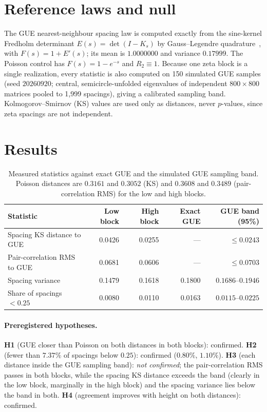 \documentclass[11pt]{article}
\begin{document}
\section{Reference laws and null}
The GUE nearest-neighbour spacing law is computed exactly from the sine-kernel Fredholm determinant
$E(s)=\det(I-K_s)$ by Gauss--Legendre quadrature~\cite{bornemann2010}, with $F(s)=1+E'(s)$; its mean is $1.0000000$
and variance $0.17999$. The Poisson control has $F(s)=1-e^{-s}$ and $R_2\equiv1$. Because one zeta block is a single
realization, every statistic is also computed on 150 simulated GUE samples (seed $20260920$; central,
semicircle-unfolded eigenvalues of independent $800\times800$ matrices pooled to 1{,}999 spacings), giving a calibrated
sampling band. Kolmogorov--Smirnov (KS) values are used only as distances, never $p$-values, since zeta spacings are
not independent.

\section{Results}
\begin{table}[h]
\centering
\begin{tabular}{lrrrr}
\toprule
Statistic & Low block & High block & Exact GUE & GUE band (95\%)\\
\midrule
Spacing KS distance to GUE & 0.0426 & 0.0255 & --- & $\le 0.0243$\\
Pair-correlation RMS to GUE & 0.0681 & 0.0606 & --- & $\le 0.0703$\\
Spacing variance & 0.1479 & 0.1618 & 0.1800 & $0.1686$--$0.1946$\\
Share of spacings $<0.25$ & 0.0080 & 0.0110 & 0.0163 & $0.0115$--$0.0225$\\
\bottomrule
\end{tabular}
\caption{Measured statistics against exact GUE and the simulated GUE sampling band. Poisson distances are
$0.3161$ and $0.3052$ (KS) and $0.3608$ and $0.3489$ (pair-correlation RMS) for the low and high blocks.}
\end{table}

\paragraph{Preregistered hypotheses.}
\textbf{H1} (GUE closer than Poisson on both distances in both blocks): confirmed.
\textbf{H2} (fewer than $7.37\%$ of spacings below $0.25$): confirmed ($0.80\%$, $1.10\%$).
\textbf{H3} (each distance inside the GUE sampling band): \emph{not confirmed}; the pair-correlation RMS passes in
both blocks, while the spacing KS distance exceeds the band (clearly in the low block, marginally in the high block)
and the spacing variance lies below the band in both.
\textbf{H4} (agreement improves with height on both distances): confirmed.
\end{document}
